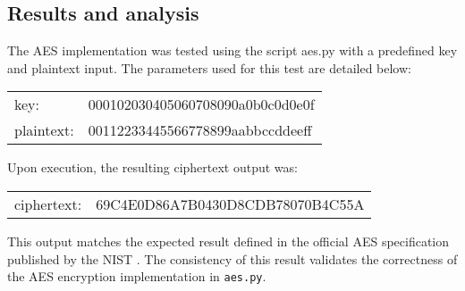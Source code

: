 \subsection{Results and analysis}

The AES implementation was tested using the script aes.py with a predefined key and plaintext input. 
The parameters used for this test are detailed below:

{\ttfamily
\begin{tabular}{ll}
    key: & 000102030405060708090a0b0c0d0e0f\\
    plaintext:\quad & 00112233445566778899aabbccddeeff
\end{tabular}
}

Upon execution, the resulting ciphertext output was:

{\ttfamily
\begin{tabular}{ll}
    ciphertext: & 69C4E0D86A7B0430D8CDB78070B4C55A
\end{tabular}
}

This output matches the expected result defined in the official \gls{AES} specification published by the \gls{NIST} \cite{NIST_AES}.
The consistency of this result validates the correctness of the \gls{AES} encryption implementation in \texttt{aes.py}.
